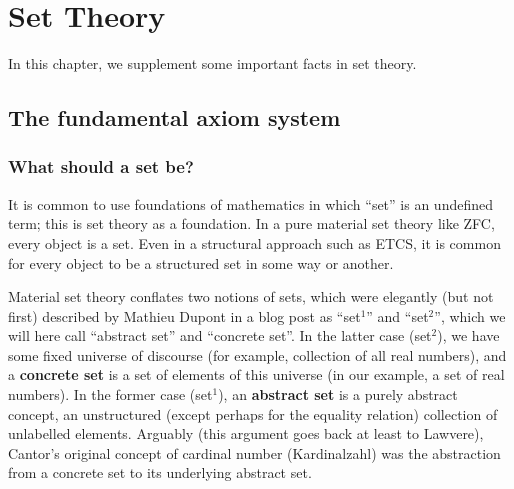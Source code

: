 \chapter{Set Theory}
  In this chapter, we supplement some important facts in set theory.
\minitoc
\newpage
\section{The fundamental axiom system}
\subsection{What should a set be?}
It is common to use foundations of mathematics in which ``set'' is an undefined term; this is set theory as a foundation. In a pure material set theory like ZFC, every object is a set. Even in a structural approach such as ETCS, it is common for every object to be a structured set in some way or another.

Material set theory conflates two notions of sets, which were elegantly (but not first) described by Mathieu Dupont in a blog post as ``set$^1$'' and ``set$^2$'', which we will here call ``abstract set'' and ``concrete set''. In the latter case (set$^2$), we have some fixed universe of discourse (for example, collection of all real numbers), and a \textbf{concrete set} is a set of elements of this universe (in our example, a set of real numbers). In the former case (set$^1$), an \textbf{abstract set} is a purely abstract concept, an unstructured (except perhaps for the equality relation) collection of unlabelled elements. Arguably (this argument goes back at least to Lawvere), Cantor's original concept of cardinal number (Kardinalzahl) was the abstraction from a concrete set to its underlying abstract set.

